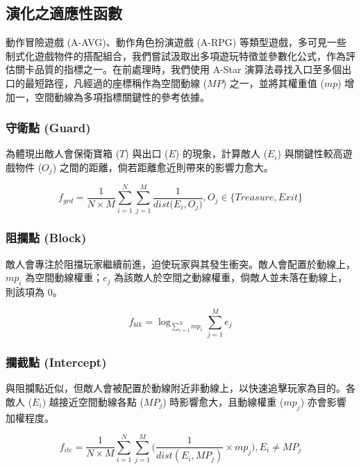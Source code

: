 \subsection{演化之適應性函數}
\label{ssec:method-segments-fitnesses}

動作冒險遊戲 (A-AVG)、動作角色扮演遊戲 (A-RPG) 等類型遊戲，多可見一些制式化遊戲物件的搭配組合，我們嘗試汲取出多項遊玩特徵並參數化公式，作為評估關卡品質的指標之一。在前處理時，我們使用 A-Star 演算法尋找入口至多個出口的最短路徑，凡經過的座標稱作為空間動線 ($MP$) 之一，並將其權重值 ($mp$) 增加一，空間動線為多項指標關鍵性的參考依據。

\subsubsection{守衛點 (Guard)}
\label{sssec:method-segments-fitnesses-guard}

為體現出敵人會保衛寶箱 ($T$) 與出口 ($E$) 的現象，計算敵人 ($E_{i}$) 與關鍵性較高遊戲物件 ($O_{j}$) 之間的距離，倘若距離愈近則帶來的影響力愈大。

\begin{equation}
    f_{grd}=\frac{1}{N \times M} \sum_{i=1}^{N} \sum_{j=1}^{M} \frac{1}{dist\big(E_{i}, O_{j}\big)}, O_{j} \in \{ Treasure, Exit \}
\end{equation}

\subsubsection{阻攔點 (Block)}
\label{sssec:method-segments-fitnesses-block}

敵人會專注於阻擋玩家繼續前進，迫使玩家與其發生衝突。敵人會配置於動線上，$mp_{i}$ 為空間動線權重；$e_j$ 為該敵人於空間之動線權重，倘敵人並未落在動線上，則該項為 0。

\begin{equation}
    f_{blk}=\log _{\sum_{i=1}^{N} mp_{i}} \sum_{j=1}^{M} e_{j}
\end{equation}

\subsubsection{攔截點 (Intercept)}
\label{sssec:method-segments-fitnesses-intercept}

與阻攔點近似，但敵人會被配置於動線附近非動線上，以快速追擊玩家為目的。各敵人 ($E_{i}$) 越接近空間動線各點 ($MP_{j}$) 時影響愈大，且動線權重 ($mp_{j}$) 亦會影響加權程度。

\begin{equation}
    f_{itc} = \frac{1}{N \times M} \sum_{i=1}^{N} \sum_{j=1}^{M} \Big( \frac{1}{dist(E_{i}, MP_{j})} \times mp_{j} \Big), 
    E_{i} \neq MP_{j}
\end{equation}

